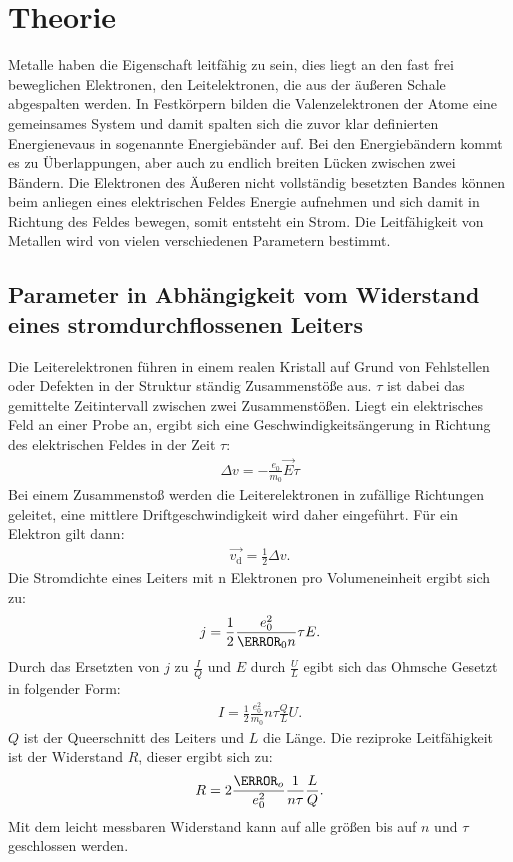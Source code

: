 \section{Theorie}
\label{sec:Theorie}
Metalle haben die Eigenschaft leitfähig zu sein, dies liegt an den
fast frei beweglichen Elektronen, den Leitelektronen, die aus der äußeren Schale abgespalten werden.
In Festkörpern bilden die Valenzelektronen der Atome eine gemeinsames System und damit spalten sich
die zuvor klar definierten Energienevaus in sogenannte Energiebänder auf.
Bei den Energiebändern kommt es zu Überlappungen, aber auch zu endlich breiten Lücken zwischen zwei Bändern.
Die Elektronen des Äußeren nicht vollständig besetzten Bandes können beim anliegen eines elektrischen Feldes Energie aufnehmen
und sich damit in Richtung des Feldes bewegen, somit entsteht ein Strom. Die Leitfähigkeit von Metallen wird von vielen verschiedenen Parametern bestimmt.

\subsection{Parameter in Abhängigkeit vom Widerstand eines stromdurchflossenen Leiters}
Die Leiterelektronen führen in einem realen Kristall auf Grund von Fehlstellen oder Defekten in der Struktur ständig
Zusammenstöße aus. $\tau$ ist dabei das gemittelte Zeitintervall zwischen zwei Zusammenstößen. Liegt ein elektrisches Feld an
einer Probe an, ergibt sich eine Geschwindigkeitsängerung in Richtung des elektrischen Feldes in der Zeit $\tau$:
\begin{align}
\Delta v=-\frac{e_0}{m_0}\vec{E}\tau
\end{align}
Bei einem Zusammenstoß werden die Leiterelektronen in zufällige Richtungen geleitet, eine mittlere Driftgeschwindigkeit wird daher eingeführt.
Für ein Elektron gilt dann:
\begin{align}
\vec{v_\mathrm{d}}=\frac{1}{2}\Delta v.
\end{align}
Die Stromdichte eines Leiters mit n Elektronen pro Volumeneinheit ergibt sich zu:
\begin{align}
j=\frac{1}{2}\frac{e_0^2}{\m_0 n} \tau E.
\end{align}
Durch das Ersetzten von $j$ zu $\frac{I}{Q}$ und $E$ durch $\frac{U}{L}$ egibt sich das Ohmsche Gesetzt in folgender Form:
\begin{align}
I=\frac{1}{2}\frac{e_0^2}{m_0}n\tau \frac{Q}{L}U.
\end{align}
$Q$ ist der Queerschnitt des Leiters und $L$ die Länge.
Die reziproke Leitfähigkeit ist der Widerstand $R$, dieser ergibt sich zu:
\begin{align}
R=2\frac{\m_o}{e_0^2}\frac{1}{n\tau}\frac{L}{Q}.
\end{align}
Mit dem leicht messbaren Widerstand kann auf alle größen bis auf $n$ und $\tau$ geschlossen werden.

